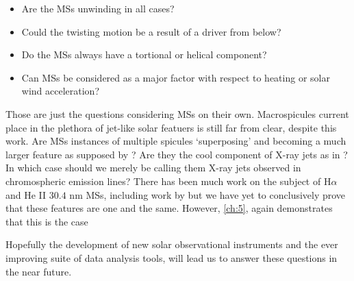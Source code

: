 \begin{itemize}
	\item{Are the MSs unwinding in all cases?}
	\item{Could the twisting motion be a result of a driver from below?}
	\item{Do the MSs always have a tortional or helical component?}
	\item{Can MSs be considered as a major factor with respect to heating or solar wind acceleration?}
\end{itemize}
 
 
Those are just the questions considering MSs on their own.
Macrospicules current place in the plethora of jet-like solar featuers is still far from clear, despite this work.
Are MSs instances of multiple spicules `superposing' and becoming a much larger feature as supposed by \cite{Xia2005}?
Are they the cool component of X-ray jets as in \cite{Parenti2002}? In which case should we merely be calling them X-ray jets observed in chromospheric emission lines?
There has been much work on the subject of H$\alpha$ and He II $30.4$ nm MSs, including work by \cite{LaBonte79,Wang1998} but we have yet to conclusively prove that these features are one and the same.
However, \cref{ch:5}, again demonstrates that this is the case
 
Hopefully the development of new solar observational instruments and the ever improving suite of data analysis tools, will lead us to answer these questions in the near future. 
 


